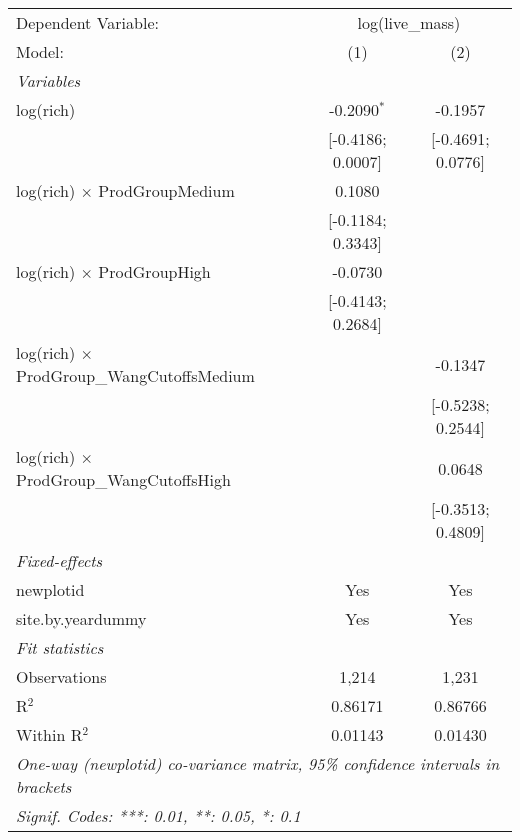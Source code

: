 \begin{tabular}{lcc}
\tabularnewline\midrule\midrule
Dependent Variable:&\multicolumn{2}{c}{log(live\_mass)}\\
Model:&(1) & (2)\\
\midrule \emph{Variables}&   &  \\
log(rich)&-0.2090$^{*}$ & -0.1957\\
  &[-0.4186; 0.0007] & [-0.4691; 0.0776]\\
log(rich) $\times $ ProdGroupMedium&0.1080 &   \\
  &[-0.1184; 0.3343] &   \\
log(rich) $\times $ ProdGroupHigh&-0.0730 &   \\
  &[-0.4143; 0.2684] &   \\
log(rich) $\times $ ProdGroup\_WangCutoffsMedium&   & -0.1347\\
  &   & [-0.5238; 0.2544]\\
log(rich) $\times $ ProdGroup\_WangCutoffsHigh&   & 0.0648\\
  &   & [-0.3513; 0.4809]\\
\midrule \emph{Fixed-effects}&   &  \\
newplotid & Yes & Yes\\
site.by.yeardummy & Yes & Yes\\
\midrule \emph{Fit statistics}&  & \\
Observations & 1,214&1,231\\
R$^2$ & 0.86171&0.86766\\
Within R$^2$ & 0.01143&0.01430\\
\midrule\midrule\multicolumn{3}{l}{\emph{One-way (newplotid) co-variance matrix, 95\% confidence intervals in brackets}}\\
\multicolumn{3}{l}{\emph{Signif. Codes: ***: 0.01, **: 0.05, *: 0.1}}\\
\end{tabular}


